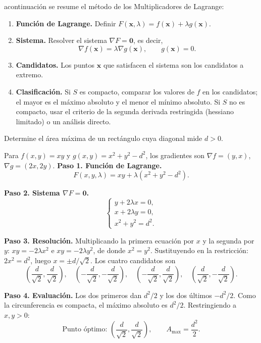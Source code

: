 \begin{pasos} acontinuación se resume el método de los Multiplicadores de Lagrange:
\begin{enumerate}
    \item \textbf{Función de Lagrange.} Definir $F(\mathbf{x},\lambda)=f(\mathbf{x})+\lambda g(\mathbf{x})$.
    \item \textbf{Sistema.} Resolver el sistema $\nabla F=\mathbf{0}$, es decir,
    \[
    \nabla f(\mathbf{x})=\lambda\nabla g(\mathbf{x}),\qquad g(\mathbf{x})=0.
    \]
    \item \textbf{Candidatos.} Los puntos $\mathbf{x}$ que satisfacen el sistema son los candidatos a extremo.
    \item \textbf{Clasificación.} Si $S$ es compacto, comparar los valores de $f$ en los candidatos; el mayor es el máximo absoluto y el menor el mínimo absoluto. Si $S$ no es compacto, usar el criterio de la segunda derivada restringida (hessiano limitado) o un análisis directo.
\end{enumerate}
\end{pasos}

\begin{example} 
Determine el área máxima de un rectángulo cuya diagonal mide $d>0$.

\begin{myproof}
Para $f(x,y)=xy$ y $g(x,y)=x^2+y^2-d^2$, los gradientes son $\nabla f=(y,x)$, $\nabla g=(2x,2y)$.
\textbf{Paso 1. Función de Lagrange.}
\[
F(x,y,\lambda)=xy+\lambda(x^2+y^2-d^2).
\]

\textbf{Paso 2. Sistema $\nabla F=\mathbf{0}$.}
\[
\begin{cases}
y+2\lambda x=0,\\
x+2\lambda y=0,\\
x^2+y^2=d^2.
\end{cases}
\]

\textbf{Paso 3. Resolución.}
Multiplicando la primera ecuación por $x$ y la segunda por $y$: $xy=-2\lambda x^2$ e $xy=-2\lambda y^2$, de donde $x^2=y^2$. Sustituyendo en la restricción: $2x^2=d^2$, luego $x=\pm d/\sqrt{2}$. Los cuatro candidatos son
\[
\left(\frac{d}{\sqrt2},\frac{d}{\sqrt2}\right),\quad
\left(-\frac{d}{\sqrt2},-\frac{d}{\sqrt2}\right),\quad
\left(-\frac{d}{\sqrt2},\frac{d}{\sqrt2}\right),\quad
\left(\frac{d}{\sqrt2},-\frac{d}{\sqrt2}\right).
\]

\textbf{Paso 4. Evaluación.}
Los dos primeros dan $d^2/2$ y los dos últimos $-d^2/2$. Como la circunferencia es compacta, el máximo absoluto es $d^2/2$. Restringiendo a $x,y>0$:
\[
\boxed{\text{Punto óptimo: } \left(\frac{d}{\sqrt2},\frac{d}{\sqrt2}\right),\qquad A_{\max}=\frac{d^2}{2}}.
\]
\end{myproof}
\end{example}

